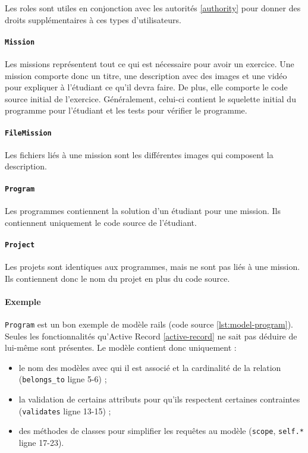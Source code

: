 Les \glspl{role} sont utiles en conjonction avec les autorités \ref{authority} pour donner des droits supplémentaires à ces types d'utilisateurs.

\paragraph{\texttt{Mission}} Les \glspl{mission} représentent tout ce qui est nécessaire pour avoir un exercice. Une \gls{mission} comporte donc un titre, une description avec des images et une vidéo pour expliquer à l'étudiant ce qu'il devra faire. De plus, elle comporte le code source initial de l'exercice. Généralement, celui-ci contient le squelette initial du programme pour l'étudiant et les tests pour vérifier le programme.

\paragraph{\texttt{FileMission}} Les fichiers liés à une \gls{mission} sont les différentes images qui composent la description.

\paragraph{\texttt{Program}} Les programmes contiennent la solution d'un étudiant pour une \gls{mission}. Ils contiennent uniquement le code source de l'étudiant.

\paragraph{\texttt{Project}} Les projets sont identiques aux programmes, mais ne sont pas liés à une \gls{mission}. Ils contiennent donc le nom du projet en plus du code source.

\paragraph{Exemple} \texttt{Program} est un bon exemple de modèle \gls{rails} (code source \ref{lst:model-program}). Seules les fonctionnalités qu’Active Record \ref{active-record} ne sait pas déduire de lui-même sont présentes. Le modèle contient donc uniquement :
\begin{itemize}
  \item le nom des modèles avec qui il est associé et la cardinalité de la relation (\lstinline[language=Rails]{belongs_to} ligne 5-6) ;
  \item la validation de certains attributs pour qu'ils respectent certaines contraintes (\lstinline[language=Rails]{validates} ligne 13-15) ;
  \item des méthodes de classes pour simplifier les requêtes au modèle (\lstinline[language=Rails]{scope},  \lstinline[language=Rails]{self.*} ligne 17-23).
\end{itemize}

